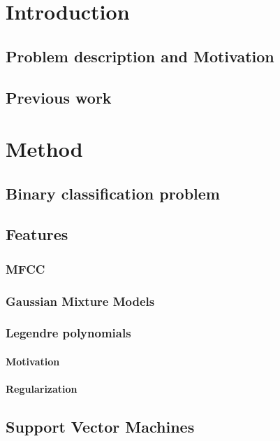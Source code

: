 \documentclass[11pt,a4paper]{tesis}
\begin{document}
\linespread{1.6}
\tableofcontents
\chapter{Introduction}
	\section{Problem description and Motivation}
		
	\section{Previous work}
		
\chapter{Method}
	\section{Binary classification problem}
		
	\section{Features}
		\subsection{MFCC}
			
		\subsection{Gaussian Mixture Models}
			
		\subsection{Legendre polynomials}
			
			\subsubsection{Motivation}
				
			\subsubsection{Regularization}
				
	\section{Support Vector Machines}
		
\end{document}
